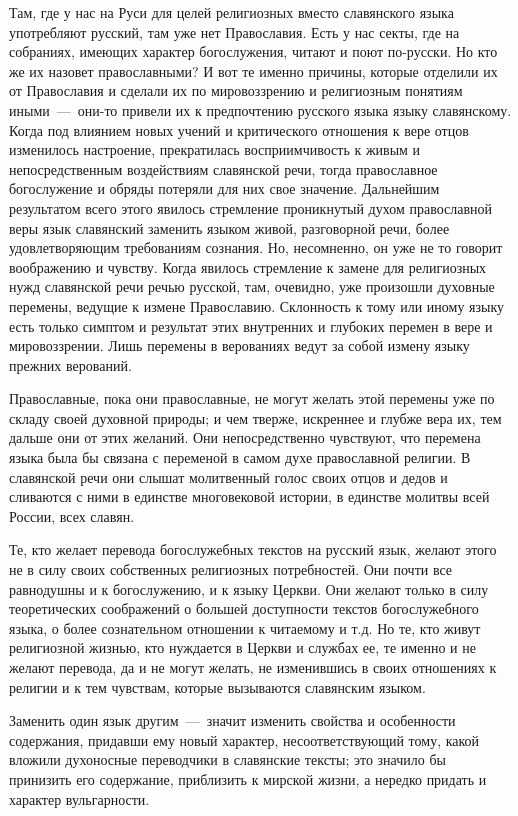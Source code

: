 \documentclass[11pt,a4paper,oneside]{memoir}
\begin{document}
    Там, где у нас на Руси для целей религиозных вместо славянского языка употребляют русский, там уже нет Православия. Есть у нас секты, где на собраниях, имеющих характер богослужения, читают и поют по-русски. Но кто же их назовет православными? И вот те именно причины, которые отделили их от Православия и сделали их по мировоззрению и религиозным понятиям иными~---~они-то привели их к предпочтению русского языка языку славянскому. Когда под влиянием новых учений и критического отношения к вере отцов изменилось настроение, прекратилась восприимчивость к живым и непосредственным воздействиям славянской речи, тогда православное богослужение и обряды потеряли для них свое значение. Дальнейшим результатом всего этого явилось стремление проникнутый духом православной веры язык славянский заменить языком живой, разговорной речи, более удовлетворяющим требованиям сознания. Но, несомненно, он уже не то говорит воображению и чувству. Когда явилось стремление к замене для религиозных нужд славянской речи речью русской, там, очевидно, уже произошли духовные перемены, ведущие к измене Православию. Склонность к тому или иному языку есть только симптом и результат этих внутренних и глубоких перемен в вере и мировоззрении. Лишь перемены в верованиях ведут за собой измену языку прежних верований.
    
    Православные, пока они православные, не могут желать этой перемены уже по складу своей духовной природы; и чем тверже, искреннее и глубже вера их, тем дальше они от этих желаний. Они непосредственно чувствуют, что перемена языка была бы связана с переменой в самом духе православной религии. В славянской речи они слышат молитвенный голос своих отцов и дедов и сливаются с ними в единстве многовековой истории, в единстве молитвы всей России, всех славян.
    
    Те, кто желает перевода богослужебных текстов на русский язык, желают этого не в силу своих собственных религиозных потребностей. Они почти все равнодушны и к богослужению, и к языку Церкви. Они желают только в силу теоретических соображений о большей доступности текстов богослужебного языка, о более сознательном отношении к читаемому и т.д. Но те, кто живут религиозной жизнью, кто нуждается в Церкви и службах ее, те именно и не желают перевода, да и не могут желать, не изменившись в своих отношениях к религии и к тем чувствам, которые вызываются славянским языком.
    
    Заменить один язык другим~---~значит изменить свойства и особенности содержания, придавши ему новый характер, несоответствующий тому, какой вложили духоносные переводчики в славянские тексты; это значило бы принизить его содержание, приблизить к мирской жизни, а нередко придать и характер вульгарности.
    
\end{document}
